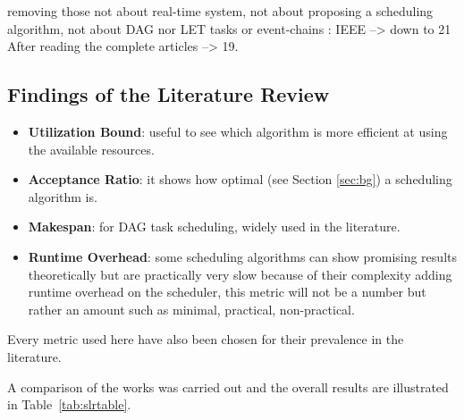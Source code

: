             removing those not about real-time system,
            not about proposing a scheduling algorithm,
            not about DAG nor LET tasks or event-chains : IEEE --> down to 21
            After reading the complete articles --> 19.

\paragraph{}

\subsection{Findings of the Literature Review}

\begin{itemize}
    \item \textbf{Utilization Bound}: useful to see which algorithm is more efficient at using the available resources.
    \item \textbf{Acceptance Ratio}: it shows how optimal (see Section \ref{sec:bg}) a scheduling algorithm is.
    \item \textbf{Makespan}: for DAG task scheduling, widely used in the literature.
    \item \textbf{Runtime Overhead}: some scheduling algorithms can show promising results theoretically but are practically very slow because 
    of their complexity adding runtime overhead on the scheduler, this metric will not be a number but rather an amount such as minimal, practical, non-practical.
\end{itemize}
Every metric used here have also been chosen for their prevalence in the literature.

A comparison of the works was carried out and the overall results are illustrated in Table~\ref{tab:slrtable}.
 

